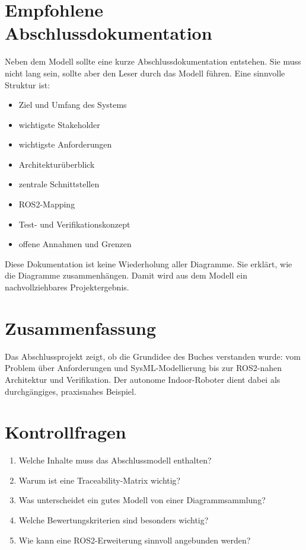 \section{Empfohlene Abschlussdokumentation}
Neben dem Modell sollte eine kurze Abschlussdokumentation entstehen. Sie muss nicht lang sein, sollte aber den Leser durch das Modell führen. Eine sinnvolle Struktur ist:

\begin{itemize}
    \item Ziel und Umfang des Systems
    \item wichtigste Stakeholder
    \item wichtigste Anforderungen
    \item Architekturüberblick
    \item zentrale Schnittstellen
    \item ROS2-Mapping
    \item Test- und Verifikationskonzept
    \item offene Annahmen und Grenzen
\end{itemize}

Diese Dokumentation ist keine Wiederholung aller Diagramme. Sie erklärt, wie die Diagramme zusammenhängen. Damit wird aus dem Modell ein nachvollziehbares Projektergebnis.

\section{Zusammenfassung}
Das Abschlussprojekt zeigt, ob die Grundidee des Buches verstanden wurde: vom Problem über Anforderungen und SysML-Modellierung bis zur ROS2-nahen Architektur und Verifikation. Der autonome Indoor-Roboter dient dabei als durchgängiges, praxisnahes Beispiel.

\section{Kontrollfragen}
\begin{enumerate}
    \item Welche Inhalte muss das Abschlussmodell enthalten?
    \item Warum ist eine Traceability-Matrix wichtig?
    \item Was unterscheidet ein gutes Modell von einer Diagrammsammlung?
    \item Welche Bewertungskriterien sind besonders wichtig?
    \item Wie kann eine ROS2-Erweiterung sinnvoll angebunden werden?
\end{enumerate}

